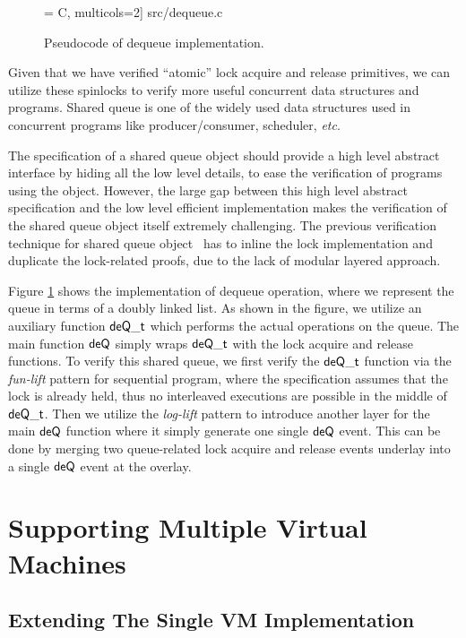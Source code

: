 \begin{figure}[t]
 = C, multicols=2] {src/dequeue.c}
\caption{Pseudocode of dequeue implementation.}
\label{fig:exp:dequeue}
\end{figure}

Given that we have verified ``atomic'' lock acquire and release primitives,
we can utilize these spinlocks to verify more useful concurrent
data structures and programs. Shared queue is one of the widely used
data structures used in concurrent programs like producer/consumer,
scheduler, {\it etc}. 

The specification of a shared queue object should provide a high level abstract
interface by hiding all the low level details,
to ease the verification of programs using the object.
However, the large gap between this high level abstract specification
and the low level efficient implementation makes the verification of the shared queue object
itself extremely challenging.
The previous verification technique for shared queue object~\cite{lili16}
has to inline the lock implementation and duplicate the lock-related proofs, due
to the lack of modular layered approach.

Figure \ref{fig:exp:dequeue} shows the implementation of dequeue operation, where
we represent the queue in terms of a doubly linked list. 
As shown in the figure, we utilize an auxiliary function $\mathsf{deQ}\mathsf{\textcolor{black}{\_t}}$ which
performs the actual operations on the queue. The main function $\mathsf{deQ}$ simply
wraps $\mathsf{deQ}\mathsf{\textcolor{black}{\_t}}$ with the lock acquire and release functions.
To verify this shared queue, we first verify the $\mathsf{deQ}\mathsf{\textcolor{black}{\_t}}$ function
via the  \emph{fun-lift} pattern for sequential program, where the specification
assumes that the lock is already held, thus no interleaved executions are possible
in the middle of $\mathsf{deQ}\mathsf{\textcolor{black}{\_t}}$. Then we utilize 
the \emph{log-lift} pattern to introduce another layer for the main $\mathsf{deQ}$ function
where it simply generate one single $\mathsf{deQ}$ event. This can be done by merging two
queue-related lock acquire and release events underlay into a single $\mathsf{deQ}$ event
at the overlay. 


\section{Supporting Multiple Virtual Machines}

\subsection{Extending The Single VM Implementation}

